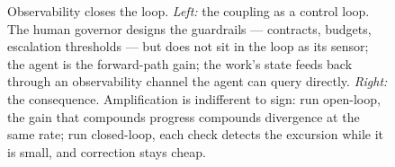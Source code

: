 \documentclass[11pt,a4paper,twocolumn]{article}
\begin{document}
\begin{figure}[t]
\caption{Observability closes the loop. \emph{Left:} the coupling
as a control loop. The human governor designs the guardrails ---
contracts, budgets, escalation thresholds --- but does not sit in
the loop as its sensor; the agent is the forward-path gain; the
work's state feeds back through an observability channel the
agent can query directly. \emph{Right:} the consequence.
Amplification is indifferent to sign: run open-loop, the gain
that compounds progress compounds divergence at the same rate;
run closed-loop, each check detects the excursion while it is
small, and correction stays cheap.}
\label{fig:loop}
\end{figure}
\end{document}
